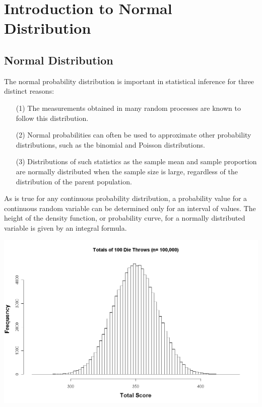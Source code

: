 \documentclass[]{report}
\begin{document}
\chapter{Introduction to Normal Distribution}

	\section{Normal Distribution} The normal probability distribution is important in statistical inference for three distinct reasons:
	
	\begin{itemize}
		\item[(1)] The measurements obtained in many random processes are known to follow this distribution.
		\item[(2)] Normal probabilities can often be used to approximate other probability distributions, such as the
		binomial and Poisson distributions.
		\item[(3)] Distributions of such statistics as the sample mean and sample proportion are normally distributed
		when the sample size is large, regardless of the distribution of the parent population.
	\end{itemize}
	As is true for any continuous probability distribution, a probability value for a continuous random variable can be determined only for an interval of values. The height of the density function, or probability curve, for a normally distributed variable is given by an integral formula.
	
	
	
	
	
	\begin{center}
		\includegraphics[scale=0.30]{images/3aDieHist3}
	\end{center}
\end{document}
